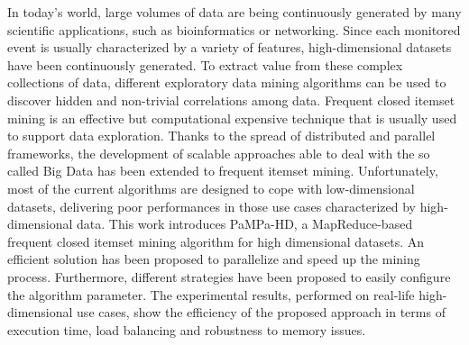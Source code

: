 




In today's world, large volumes of data are being continuously
generated by many scientific applications, such as bioinformatics or networking.
Since each monitored event is usually characterized by a variety of features,
high-dimensional datasets have been continuously generated. 
To extract value from these complex collections of data, different exploratory data mining algorithms
can be used to discover hidden and non-trivial correlations among data.
Frequent closed itemset mining is an effective but computational expensive 
technique that is usually used to support data exploration. 
Thanks to the spread of distributed and
parallel frameworks, the development of scalable approaches able to deal with
the so called Big Data has been extended to frequent itemset mining.
Unfortunately, most of the current algorithms are designed to cope with
low-dimensional datasets,
delivering poor performances in those use cases characterized by
high-dimensional data.
This work introduces PaMPa-HD, a MapReduce-based frequent closed
itemset mining algorithm for high dimensional datasets.
An efficient solution has been proposed to 
parallelize and speed up the mining process. Furthermore, different strategies have been proposed to easily configure the algorithm parameter.
The experimental results, performed on real-life high-dimensional use cases,
show the efficiency of the proposed approach in terms of execution time, load balancing and robustness to memory issues.

